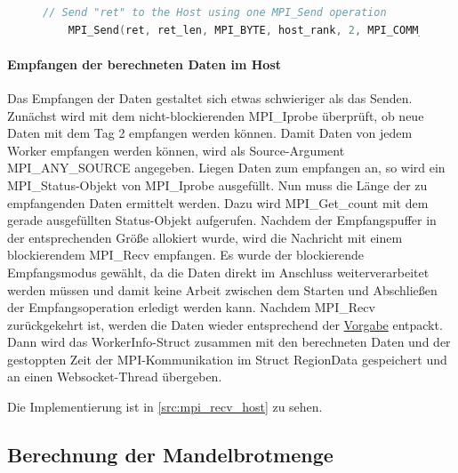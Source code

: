 \begin{figure}[h!]
	\begin{lstlisting}[language=c++, caption={Senden der berechneten Daten im Worker}, label={src:mpi_send_worker}, firstnumber=161]
	// Send "ret" to the Host using one MPI_Send operation
	MPI_Send(ret, ret_len, MPI_BYTE, host_rank, 2, MPI_COMM_WORLD);
	\end{lstlisting}
\end{figure}

\paragraph{Empfangen der berechneten Daten im Host}\label{para:recv_host}

Das Empfangen der Daten gestaltet sich etwas schwieriger als das Senden. Zunächst wird mit dem nicht-blockierenden MPI\_Iprobe überprüft, ob neue Daten mit dem Tag 2 empfangen werden können. Damit Daten von jedem Worker empfangen werden können, wird als Source-Argument MPI\_ANY\_SOURCE angegeben. Liegen Daten zum empfangen an, so wird ein MPI\_Status-Objekt von MPI\_Iprobe ausgefüllt. Nun muss die Länge der zu empfangenden Daten ermittelt werden. Dazu wird MPI\_Get\_count mit dem gerade ausgefüllten Status-Objekt aufgerufen. Nachdem der Empfangspuffer in der entsprechenden Größe allokiert wurde, wird die Nachricht mit einem blockierendem MPI\_Recv empfangen. Es wurde der blockierende Empfangsmodus gewählt, da die Daten direkt im Anschluss weiterverarbeitet werden müssen und damit keine Arbeit zwischen dem Starten und Abschließen der Empfangsoperation erledigt werden kann. Nachdem MPI\_Recv zurückgekehrt ist, werden die Daten wieder entsprechend der \hyperref[para:struktur_daten]{Vorgabe} entpackt. Dann wird das WorkerInfo-Struct zusammen mit den berechneten Daten und der gestoppten Zeit der MPI-Kommunikation im Struct RegionData gespeichert und an einen Websocket-Thread übergeben.

Die Implementierung ist in \autoref{src:mpi_recv_host} zu sehen.

\begin{figure}[h!]
	
\end{figure}

\subsection{Berechnung der Mandelbrotmenge}

